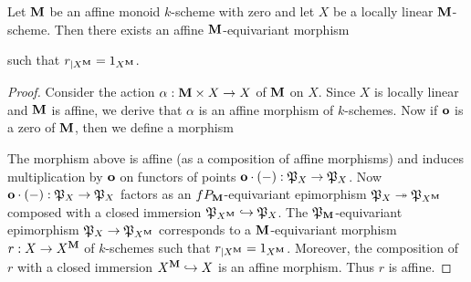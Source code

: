 \begin{proposition}\label{proposition:retraction_for_monoids_with_zero}
Let $\mathbf{M}$ be an affine monoid $k$-scheme with zero and let $X$ be a locally linear $\mathbf{M}$-scheme. Then there exists an affine $\mathbf{M}$-equivariant morphism
\begin{center}
\end{center}
such that $r_{\mid X^{\mathbf{M}}} = 1_{X^{\mathbf{M}}}$.
\end{proposition}
\begin{proof}
Consider the action $\alpha:\mathbf{M}\times X\rightarrow X$ of $\mathbf{M}$ on $X$. Since $X$ is locally linear and $\mathbf{M}$ is affine, we derive that $\alpha$ is an affine morphism of $k$-schemes. Now if $\mathbf{o}$ is a zero of $\mathbf{M}$, then we define a morphism 
\begin{center}
\end{center}
The morphism above is affine (as a composition of affine morphisms) and induces multiplication by $\mathbf{o}$ on functors of points $\mathbf{o}\cdot(-):{\mathfrak P}_X\rightarrow {\mathfrak P}_X$. Now $\mathbf{o}\cdot (-):{\mathfrak P}_X\rightarrow {\mathfrak P}_X$ factors as an $fP_{\mathbf{M}}$-equivariant epimorphism ${\mathfrak P}_X\twoheadrightarrow {\mathfrak P}_{X^{\mathbf{M}}}$ composed with a closed immersion ${\mathfrak P}_{X^{\mathbf{M}}}\hookrightarrow {\mathfrak P}_X$. The ${\mathfrak P}_{\mathbf{M}}$-equivariant epimorphism ${\mathfrak P}_X\rightarrow {\mathfrak P}_{X^{\mathbf{M}}}$ corresponds to a $\mathbf{M}$-equivariant morphism $r:X\rightarrow X^{\mathbf{M}}$ of $k$-schemes such that $r_{\mid X^{\mathbf{M}}} = 1_{X^{\mathbf{M}}}$. Moreover, the composition of $r$ with a closed immersion $X^{\mathbf{M}}\hookrightarrow X$ is an affine morphism. Thus $r$ is affine.
\end{proof}



